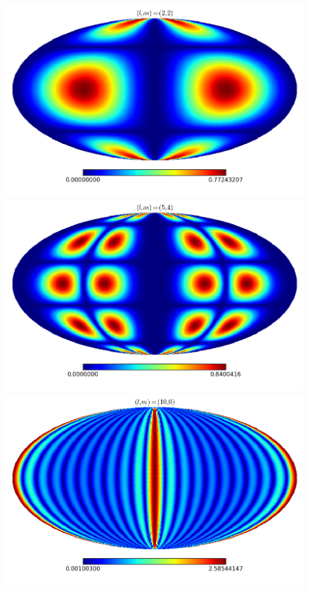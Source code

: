 \begin{figure}
\begin{center}
\includegraphics[scale=0.3]{Fourier/(2,2).png}
\includegraphics[scale=0.3]{Fourier/(5,4).png}
\includegraphics[scale=0.3]{Fourier/(10,0).png}

\end{center}
\end{figure}

